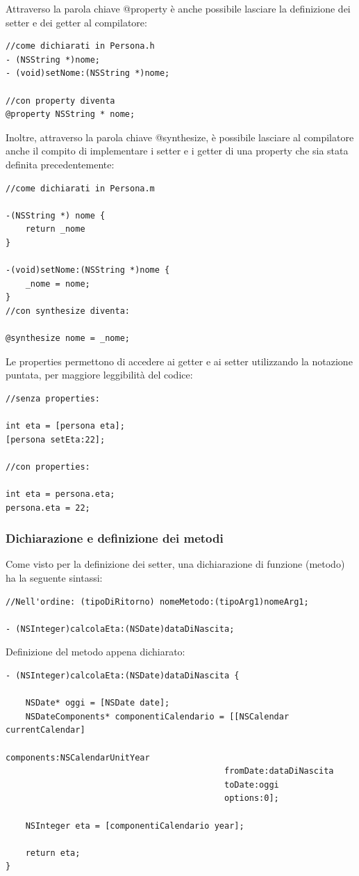 \bigskip
\bigskip
\bigskip
Attraverso la parola chiave @property è anche possibile lasciare la definizione dei setter e dei getter al compilatore:
\lstset{language=[Objective]C, breakindent=40pt, breaklines}
\begin{lstlisting}
//come dichiarati in Persona.h
- (NSString *)nome;
- (void)setNome:(NSString *)nome;

//con property diventa
@property NSString * nome;
\end{lstlisting}
\bigskip
\bigskip
\bigskip
Inoltre, attraverso la parola chiave @synthesize, è possibile lasciare al compilatore anche il compito di implementare i setter e i getter di una property che sia stata definita precedentemente:
\lstset{language=[Objective]C, breakindent=40pt, breaklines}
\begin{lstlisting}
//come dichiarati in Persona.m

-(NSString *) nome {
	return _nome
}

-(void)setNome:(NSString *)nome {
	_nome = nome;
}
//con synthesize diventa:

@synthesize nome = _nome; 
\end{lstlisting}
Le properties permettono di accedere ai getter e ai setter utilizzando la notazione puntata, per maggiore leggibilità del codice:
\lstset{language=[Objective]C, breakindent=40pt, breaklines}
\begin{lstlisting}
//senza properties: 

int eta = [persona eta]; 
[persona setEta:22]; 

//con properties: 

int eta = persona.eta;
persona.eta = 22;
\end{lstlisting}
\newpage
\subsubsection{Dichiarazione e definizione dei metodi}
Come visto per la definizione dei setter, una dichiarazione di funzione (metodo) ha la seguente sintassi: 
\lstset{language=[Objective]C, breakindent=40pt, breaklines}
\begin{lstlisting}
//Nell'ordine: (tipoDiRitorno) nomeMetodo:(tipoArg1)nomeArg1;

- (NSInteger)calcolaEta:(NSDate)dataDiNascita;
\end{lstlisting}
Definizione del metodo appena dichiarato: 
\lstset{language=[Objective]C, breakindent=40pt, breaklines}
\begin{lstlisting}
- (NSInteger)calcolaEta:(NSDate)dataDiNascita {

	NSDate* oggi = [NSDate date];
	NSDateComponents* componentiCalendario = [[NSCalendar currentCalendar] 
                                   			components:NSCalendarUnitYear 
                                   			fromDate:dataDiNascita
                                   			toDate:oggi
                                   			options:0];
	
	NSInteger eta = [componentiCalendario year];
	
	return eta;
}
\end{lstlisting}
